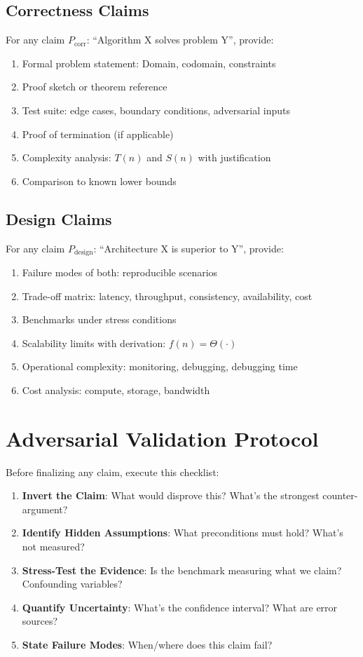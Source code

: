 \documentclass[12pt,twoside,openright]{book}
\theoremstyle{plain}
\theoremstyle{definition}
\theoremstyle{remark}
\begin{document}
\subsection{Correctness Claims}

For any claim \(P_{\text{corr}}\): ``Algorithm X solves problem Y'', provide:

\begin{enumerate}
  \item Formal problem statement: Domain, codomain, constraints
  \item Proof sketch or theorem reference
  \item Test suite: edge cases, boundary conditions, adversarial inputs
  \item Proof of termination (if applicable)
  \item Complexity analysis: $T(n)$ and $S(n)$ with justification
  \item Comparison to known lower bounds
\end{enumerate}

\subsection{Design Claims}

For any claim \(P_{\text{design}}\): ``Architecture X is superior to Y'', provide:

\begin{enumerate}
  \item Failure modes of both: reproducible scenarios
  \item Trade-off matrix: latency, throughput, consistency, availability, cost
  \item Benchmarks under stress conditions
  \item Scalability limits with derivation: $f(n) = \Theta(\cdot)$
  \item Operational complexity: monitoring, debugging, debugging time
  \item Cost analysis: compute, storage, bandwidth
\end{enumerate}

\section{Adversarial Validation Protocol}

Before finalizing any claim, execute this checklist:

\begin{enumerate}
  \item \textbf{Invert the Claim}: What would disprove this? What's the strongest counter-argument?
  \item \textbf{Identify Hidden Assumptions}: What preconditions must hold? What's not measured?
  \item \textbf{Stress-Test the Evidence}: Is the benchmark measuring what we claim? Confounding variables?
  \item \textbf{Quantify Uncertainty}: What's the confidence interval? What are error sources?
  \item \textbf{State Failure Modes}: When/where does this claim fail?
\end{enumerate}
\end{document}

